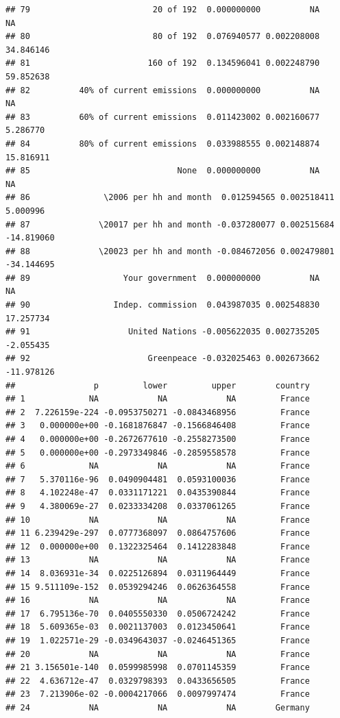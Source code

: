 \documentclass[a4paper,12pt]{article}\usepackage[]{graphicx}\usepackage[]{color}
\makeatletter
\newenvironment{kframe}{%
 \def\at@end@of@kframe{}%
 \ifinner\ifhmode%
  \def\at@end@of@kframe{\end{minipage}}%
  \begin{minipage}{\columnwidth}%
 \fi\fi%
 \def\FrameCommand##1{\hskip\@totalleftmargin \hskip-\fboxsep
 \colorbox{shadecolor}{##1}\hskip-\fboxsep
     \hskip-\linewidth \hskip-\@totalleftmargin \hskip\columnwidth}%
 \MakeFramed {\advance\hsize-\width
   \@totalleftmargin\z@ \linewidth\hsize
   \@setminipage}}%
 {\par\unskip\endMakeFramed%
 \at@end@of@kframe}
\newenvironment{knitrout}{}{} %
\makeatother
\begin{document}
\begin{knitrout}
\begin{kframe}
\begin{verbatim}
## 79                         20 of 192  0.000000000          NA          NA
## 80                         80 of 192  0.076940577 0.002208008   34.846146
## 81                        160 of 192  0.134596041 0.002248790   59.852638
## 82          40% of current emissions  0.000000000          NA          NA
## 83          60% of current emissions  0.011423002 0.002160677    5.286770
## 84          80% of current emissions  0.033988555 0.002148874   15.816911
## 85                              None  0.000000000          NA          NA
## 86               \2006 per hh and month  0.012594565 0.002518411    5.000996
## 87              \20017 per hh and month -0.037280077 0.002515684  -14.819060
## 88              \20023 per hh and month -0.084672056 0.002479801  -34.144695
## 89                   Your government  0.000000000          NA          NA
## 90                 Indep. commission  0.043987035 0.002548830   17.257734
## 91                    United Nations -0.005622035 0.002735205   -2.055435
## 92                        Greenpeace -0.032025463 0.002673662  -11.978126
##                p         lower         upper        country
## 1             NA            NA            NA         France
## 2  7.226159e-224 -0.0953750271 -0.0843468956         France
## 3   0.000000e+00 -0.1681876847 -0.1566846408         France
## 4   0.000000e+00 -0.2672677610 -0.2558273500         France
## 5   0.000000e+00 -0.2973349846 -0.2859558578         France
## 6             NA            NA            NA         France
## 7   5.370116e-96  0.0490904481  0.0593100036         France
## 8   4.102248e-47  0.0331171221  0.0435390844         France
## 9   4.380069e-27  0.0233334208  0.0337061265         France
## 10            NA            NA            NA         France
## 11 6.239429e-297  0.0777368097  0.0864757606         France
## 12  0.000000e+00  0.1322325464  0.1412283848         France
## 13            NA            NA            NA         France
## 14  8.036931e-34  0.0225126894  0.0311964449         France
## 15 9.511109e-152  0.0539294246  0.0626364558         France
## 16            NA            NA            NA         France
## 17  6.795136e-70  0.0405550330  0.0506724242         France
## 18  5.609365e-03  0.0021137003  0.0123450641         France
## 19  1.022571e-29 -0.0349643037 -0.0246451365         France
## 20            NA            NA            NA         France
## 21 3.156501e-140  0.0599985998  0.0701145359         France
## 22  4.636712e-47  0.0329798393  0.0433656505         France
## 23  7.213906e-02 -0.0004217066  0.0097997474         France
## 24            NA            NA            NA        Germany

\end{verbatim}
\end{kframe}
\end{knitrout}
\end{document}
